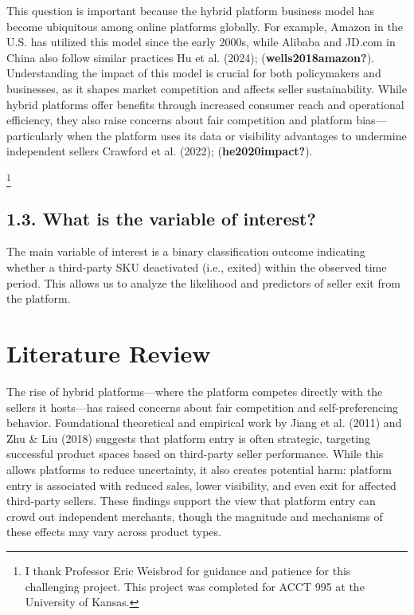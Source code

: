 \documentclass[
  letterpaper,
  DIV=11,
  numbers=noendperiod]{scrartcl}
\begin{document}
This question is important because the hybrid platform business model
has become ubiquitous among online platforms globally. For example,
Amazon in the U.S. has utilized this model since the early 2000s, while
Alibaba and JD.com in China also follow similar practices Hu et al.
(2024); (\textbf{wells2018amazon?}). Understanding the impact of this
model is crucial for both policymakers and businesses, as it shapes
market competition and affects seller sustainability. While hybrid
platforms offer benefits through increased consumer reach and
operational efficiency, they also raise concerns about fair competition
and platform bias---particularly when the platform uses its data or
visibility advantages to undermine independent sellers Crawford et al.
(2022); (\textbf{he2020impact?}).

\footnote{I thank Professor Eric Weisbrod for guidance and patience for
  this challenging project. This project was completed for ACCT 995 at
  the University of Kansas.}

\subsection{1.3. What is the variable of
interest?}\label{what-is-the-variable-of-interest}

The main variable of interest is a binary classification outcome
indicating whether a third-party SKU deactivated (i.e., exited) within
the observed time period. This allows us to analyze the likelihood and
predictors of seller exit from the platform.

\section{Literature Review}\label{literature-review}

The rise of hybrid platforms---where the platform competes directly with
the sellers it hosts---has raised concerns about fair competition and
self-preferencing behavior. Foundational theoretical and empirical work
by Jiang et al. (2011) and Zhu \& Liu (2018) suggests that platform
entry is often strategic, targeting successful product spaces based on
third-party seller performance. While this allows platforms to reduce
uncertainty, it also creates potential harm: platform entry is
associated with reduced sales, lower visibility, and even exit for
affected third-party sellers. These findings support the view that
platform entry can crowd out independent merchants, though the magnitude
and mechanisms of these effects may vary across product types.
\end{document}
